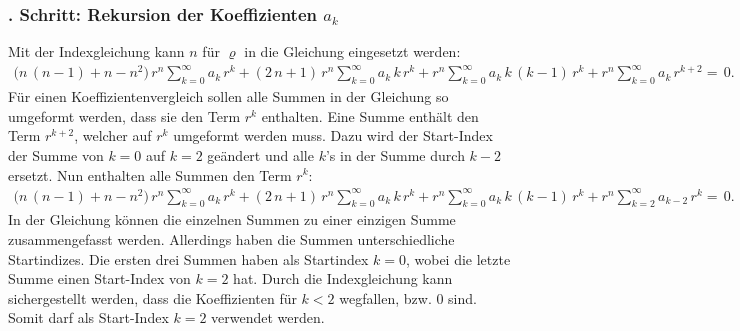 \subsubsection{. Schritt: Rekursion der Koeffizienten $a_k$}
Mit der Indexgleichung  kann $n$ f\"ur $\varrho$ in die Gleichung  eingesetzt werden:
\begin{align}
	\big(
	n \, \left( n - 1 \right)
	+
	n
	-
	n^2
	\big)
	\, r^{n}
	\sum_{k=0}^{\infty} a_k \, r^k
	+
	\left(	
	2 \, n
	+
	1
	\right)
	\, r^{n}
	\sum_{k=0}^{\infty} a_k \, k \, r^k
	+
	r^{n}
	\sum_{k=0}^{\infty} a_k \, k \, \left( k - 1 \right) \, r^k
	+
	r^{n}
	\sum_{k=0}^{\infty} a_k \, r^{k + 2}
	= \, 0
	\label{eq:bessel:potenzreihe:dgl:index:eingesetzt}
	\text{.}
\end{align}
F\"ur einen Koeffizientenvergleich sollen alle Summen in der Gleichung  so umgeformt werden,
dass sie den Term $r^k$ enthalten.
Eine Summe enth\"alt den Term $r^{k + 2}$,
welcher auf $r^k$ umgeformt werden muss.
Dazu wird der Start-Index der Summe von $k = 0$ auf $k = 2$ ge\"andert und alle $k$'s in der Summe durch $k - 2$ ersetzt.
Nun enthalten alle Summen den Term $r^k$:
\begin{align}
	\big(
	n \, \left( n - 1 \right)
	+
	n
	-
	n^2
	\big)
	\, r^{n}
	\sum_{k=0}^{\infty} a_k \, r^k
	+
	\left(	
	2 \, n
	+
	1
	\right)
	\, r^{n}
	\sum_{k=0}^{\infty} a_k \, k \, r^k
	+
	r^{n}
	\sum_{k=0}^{\infty} a_k \, k \, \left( k - 1 \right) \, r^k
	+
	r^{n}
	\sum_{k=2}^{\infty} a_{k - 2} \, r^k
	= \, 0
	\label{eq:bessel:potenzreihe:dgl:index:eingesetzt:gleichesummen}
	\text{.}
\end{align}
In der Gleichung  k\"onnen die einzelnen Summen zu einer einzigen Summe zusammengefasst werden.
Allerdings haben die Summen unterschiedliche Startindizes.
Die ersten drei Summen haben als Startindex $k = 0$,
wobei die letzte Summe einen Start-Index von $k = 2$ hat.
Durch die Indexgleichung  kann sichergestellt werden,
dass die Koeffizienten f\"ur $k < 2$ wegfallen,
bzw. 0 sind.
Somit darf als Start-Index $k = 2$ verwendet werden.
